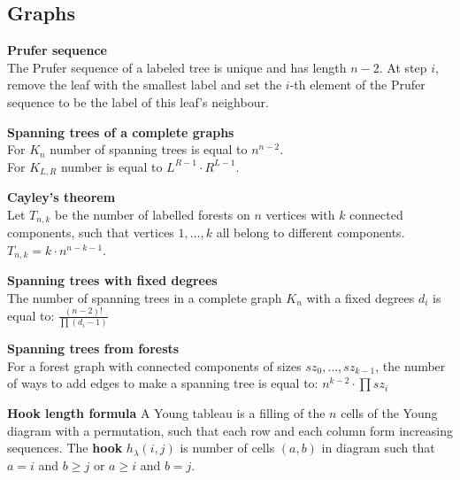 \subsection{Graphs}

\textbf{Prufer sequence}\\
The Prufer sequence of a labeled tree is unique and has length $n - 2$. 
At step $i$, remove the leaf with the smallest label and set the $i$-th 
element of the Prufer sequence to be the label of this leaf's neighbour.

\textbf{Spanning trees of a complete graphs}\\
For $K_n$ number of spanning trees is equal to $n^{n - 2}$.\\
For $K_{L, R}$ number is equal to $L^{R - 1} \cdot R^{L - 1}$.

\textbf{Cayley's theorem}\\
Let $T_{n, k}$ be the number of labelled forests on $n$ vertices with $k$ connected components, 
such that vertices $1, \dots, k$ all belong to different components. 
$T_{n,k} = k \cdot n^{n - k - 1}$.

\textbf{Spanning trees with fixed degrees}\\
The number of spanning trees in a complete graph $K_{n}$ with a fixed degrees
$d_{i}$ is equal to:
$ \frac{(n - 2)!}{\prod(d_i - 1)} $

\textbf{Spanning trees from forests}\\
For a forest graph with connected components of sizes $sz_0, \dots, sz_{k - 1}$, 
the number of ways to add edges to make a spanning tree is equal to:
$ n^{k - 2} \cdot \prod sz_i$

\textbf{Hook length formula}
A Young tableau is a filling of the $n$ cells of the Young diagram with a permutation, 
such that each row and each column form increasing sequences. 
The \textbf{hook} $h_{\lambda}(i, j)$ is number of cells $(a, b)$ in diagram such that
$a = i$ and $b \ge j$ or $a \ge i$ and $b = j$.


